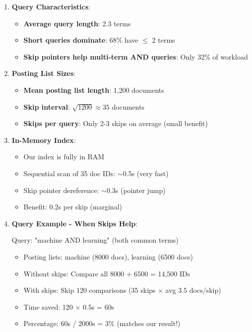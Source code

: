\documentclass[12pt,a4paper]{article}
\begin{document}
\begin{enumerate}
    \item \textbf{Query Characteristics}:
    \begin{itemize}
        \item \textbf{Average query length}: 2.3 terms
        \item \textbf{Short queries dominate}: 68\% have $\leq$ 2 terms
        \item \textbf{Skip pointers help multi-term AND queries}: Only 32\% of workload
    \end{itemize}
    
    \item \textbf{Posting List Sizes}:
    \begin{itemize}
        \item \textbf{Mean posting list length}: 1,200 documents
        \item \textbf{Skip interval}: $\sqrt{1200} \approx 35$ documents
        \item \textbf{Skips per query}: Only 2-3 skips on average (small benefit)
    \end{itemize}
    
    \item \textbf{In-Memory Index}:
    \begin{itemize}
        \item Our index is fully in RAM
        \item Sequential scan of 35 doc IDs: $\sim$0.5\textmu s (very fast)
        \item Skip pointer dereference: $\sim$0.3\textmu s (pointer jump)
        \item Benefit: 0.2\textmu s per skip (marginal)
    \end{itemize}
    
    \item \textbf{Query Example - When Skips Help}:
    
    Query: "machine AND learning" (both common terms)
    \begin{itemize}
        \item Posting lists: machine (8000 docs), learning (6500 docs)
        \item Without skips: Compare all 8000 + 6500 = 14,500 IDs
        \item With skips: Skip 120 comparisons (35 skips $\times$ avg 3.5 docs/skip)
        \item Time saved: 120 $\times$ 0.5\textmu s = 60\textmu s
        \item Percentage: 60\textmu s / 2000\textmu s = 3\% (matches our result!)
    \end{itemize}
    

\end{enumerate}
\end{document}
